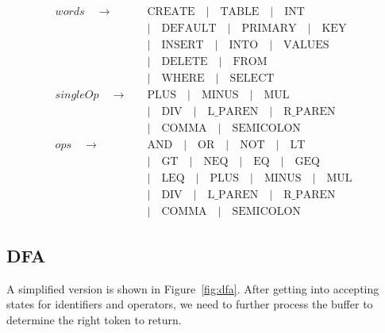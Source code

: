 \documentclass{article}
\begin{document}
\begin{align*}
words \quad\to\quad & \text{CREATE} \quad | \quad \text{TABLE}  \quad | \quad \text{INT} \\
&| \quad \text{DEFAULT} \quad | \quad \text{PRIMARY} \quad | \quad \text{KEY} \quad \\
&| \quad \text{INSERT} \quad | \quad \text{INTO} \quad | \quad \text{VALUES} \quad \\
&| \quad \text{DELETE} \quad | \quad \text{FROM} \quad \\
&| \quad \text{WHERE} \quad | \quad \text{SELECT} \\
singleOp \quad\to\quad &
\text{PLUS} \quad | \quad \text{MINUS} \quad | \quad \text{MUL} \\
&| \quad \text{DIV} \quad | \quad \text{L\_PAREN} \quad | \quad \text{R\_PAREN} \\
&| \quad \text{COMMA} \quad | \quad \text{SEMICOLON} \\
ops \quad\to\quad &
\text{AND} \quad | \quad \text{OR} \quad | \quad \text{NOT} \quad | \quad \text{LT} \\
&| \quad \text{GT} \quad | \quad \text{NEQ} \quad | \quad \text{EQ} \quad | \quad \text{GEQ} \\
&| \quad \text{LEQ} \quad | \quad \text{PLUS} \quad | \quad \text{MINUS} \quad | \quad \text{MUL} \\
&| \quad \text{DIV} \quad | \quad \text{L\_PAREN} \quad | \quad \text{R\_PAREN} \\
&| \quad \text{COMMA} \quad | \quad \text{SEMICOLON}
\end{align*}
\subsection{DFA}

A simplified version is shown in Figure~\ref{fig:dfa}. After getting into accepting states for identifiers and operators, we need to further process the buffer to determine the right token to return.
\end{document}
